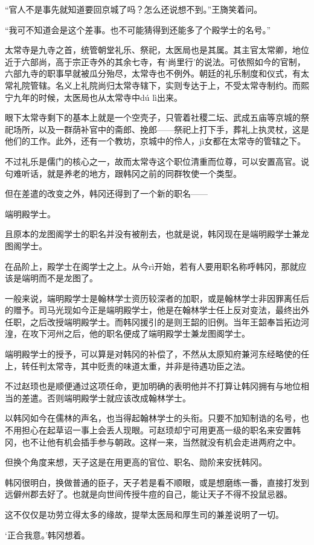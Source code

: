 “官人不是事先就知道要回京城了吗？怎么还说想不到。”王旖笑着问。

“我可不知道会是这个差事。也不可能猜得到还能多了个殿学士的名号。”

太常寺是九寺之首，统管朝堂礼乐、祭祀，太医局也是其属。其主官太常卿，地位近于六部尚，高于宗正寺外的其余七寺，有‘尚里行’的说法。可依照如今的官制，六部九寺的职事早就被瓜分殆尽，太常寺也不例外。朝廷的礼乐制度和仪式，有太常礼院管辖。名义上礼院尚归太常寺辖下，实则专达于上，不受太常寺制约。而熙宁九年的时候，太医局也从太常寺中dú lì出来。

眼下太常寺剩下的基本上就是一个空壳子，只管着社稷二坛、武成五庙等京城的祭祀场所，以及一群荫补官中的斋郎、挽郎——祭祀上打下手，葬礼上执灵杖，这是他们的工作。此外，还有一个教坊，京城中的伶人，jì女都在太常寺的管辖之下。

不过礼乐是儒门的核心之一，故而太常寺这个职位清重而位尊，可以安置高官。说句难听话，就是养老的地方，跟韩冈之前的同群牧使一个类型。

但在差遣的改变之外，韩冈还得到了一个新的职名——

端明殿学士。

且原本的龙图阁学士的职名并没有被削去，也就是说，韩冈现在是端明殿学士兼龙图阁学士。

在品阶上，殿学士在阁学士之上。从今rì开始，若有人要用职名称呼韩冈，那就应该是端明而不是龙图了。

一般来说，端明殿学士是翰林学士资历较深者的加职，或是翰林学士非因罪离任后的赠予。司马光现如今正是端明殿学士，他是在翰林学士任上反对变法，最终出外任职，之后改授端明殿学士。而韩冈援引的是则王韶的旧例。当年王韶奉旨拓边河湟，在攻下河州之后，他的职名便成了端明殿学士兼龙图阁学士。

端明殿学士的授予，可以算是对韩冈的补偿了，不然从太原知府兼河东经略使的任上，转任判太常寺，其中贬责的味道太重，并非是待遇功臣之法。

不过赵顼也是顺便通过这项任命，更加明确的表明他并不打算让韩冈拥有与地位相当的差遣。否则端明殿学士就应该改成翰林学士。

以韩冈如今在儒林的声名，也当得起翰林学士的头衔。只要不加知制诰的名号，也不用担心在起草诏一事上会丢人现眼。可赵顼却宁可用更髙一级的职名来安置韩冈，也不让他有机会插手参与朝政。这样一来，当然就没有机会走进两府之中。

但换个角度来想，天子这是在用更高的官位、职名、勋阶来安抚韩冈。

韩冈很明白，换做普通的臣子，天子若是看不顺眼，或是想磨练一番，直接打发到远僻州郡去好了。也就是向世间传授牛痘的自己，能让天子不得不投鼠忌器。

这不仅仅是功劳立得太多的缘故，提举太医局和厚生司的兼差说明了一切。

‘正合我意。’韩冈想着。

